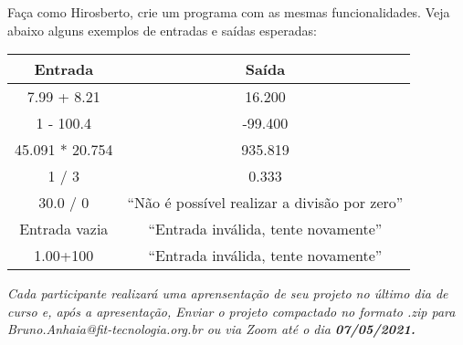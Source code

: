 \documentclass[12pt]{article}
\begin{document}
Faça como Hirosberto, crie um programa com as mesmas funcionalidades.
Veja abaixo alguns exemplos de entradas e saídas esperadas:

\begin{center}
    \begin{tabular}{c | c}
        \hline
        \textbf{Entrada} & \textbf{Saída}                                 \\
        \hline
        7.99 + 8.21      & 16.200                                         \\
        1 - 100.4        & -99.400                                        \\
        45.091 * 20.754  & 935.819                                        \\
        1 / 3            & 0.333                                          \\
        30.0 / 0         & ``Não é possível realizar a divisão por zero'' \\
        Entrada vazia    & ``Entrada inválida, tente novamente''          \\
        1.00+100         & ``Entrada inválida, tente novamente''          \\

        \hline
    \end{tabular}
\end{center}

\emph{Cada participante realizará uma aprensentação de seu projeto no último dia de curso e, após a apresentação, Enviar o projeto compactado no formato .zip para Bruno.Anhaia@fit-tecnologia.org.br ou via Zoom até o dia \textbf{07/05/2021.}}
\end{document}
